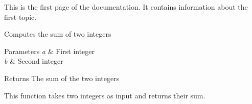 This is the first page of the documentation. It contains information about the first topic.

Computes the sum of two integers


\begin{DoxyParams}{Parameters}
{\em a} & First integer \\
\hline
{\em b} & Second integer \\
\hline
\end{DoxyParams}
\begin{DoxyReturn}{Returns}
The sum of the two integers
\end{DoxyReturn}
This function takes two integers as input and returns their sum. 